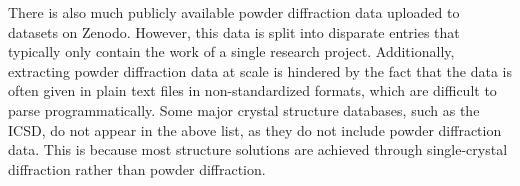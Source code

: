 There is also much publicly available powder diffraction data uploaded to datasets on Zenodo. However, this data is split into disparate entries that typically only contain the work of a single research project. Additionally, extracting powder diffraction data at scale is hindered by the fact that the data is often given in plain text files in non-standardized formats, which are difficult to parse programmatically. Some major crystal structure databases, such as the ICSD, do not appear in the above list, as they do not include powder diffraction data. This is because most structure solutions are achieved through single-crystal diffraction rather than powder diffraction.